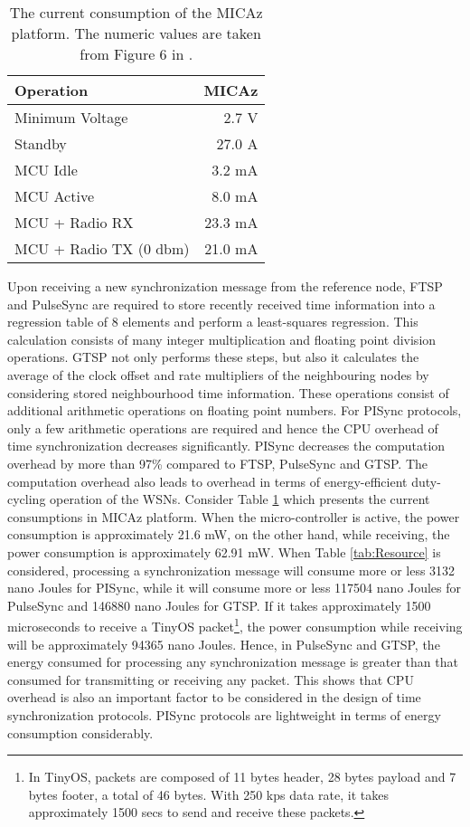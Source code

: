 \documentclass[english,a4paper,10pt,final]{article}
\numberwithin{equation}{section}
\numberwithin{figure}{section}
\begin{document}
\begin{table}
\center

\caption{The current consumption of the MICAz platform. The numeric values are taken from Figure 6 in
\cite{Telos:2005}. \label{tab:The-current-consumptions}}

{
\begin{tabular}{|l|r|}
\hline 
\textbf{Operation} & \textbf{MICAz}\\
\hline 
Minimum Voltage  & 2.7 V\\
\hline 
Standby & 27.0 A\\
MCU Idle & 3.2 mA\\
MCU Active & 8.0 mA\\
MCU + Radio RX  & 23.3 mA\\
MCU + Radio TX (0 dbm) & 21.0 mA\\
\hline
\end{tabular}
}
\end{table}

Upon receiving a new synchronization message from the reference node, FTSP and PulseSync are required to store recently received time information into a regression table of 8 elements and perform a least-squares regression. This calculation consists of many integer multiplication and floating point division operations. GTSP not only performs these steps, but also it calculates the average of the clock offset and rate multipliers of the neighbouring nodes by considering stored neighbourhood time information. These operations consist of additional arithmetic operations on floating point numbers. For PISync protocols, only a few arithmetic operations are required and hence the CPU overhead of time synchronization decreases significantly. PISync decreases the computation overhead by more than 97\% compared to FTSP, PulseSync and  GTSP. The computation overhead also leads to overhead in terms of energy-efficient duty-cycling operation of the WSNs. Consider Table \ref{tab:The-current-consumptions} which presents the current consumptions in MICAz platform. When the micro-controller is active, the power consumption is approximately 21.6 mW, on the other hand, while receiving, the power consumption is approximately 62.91 mW. When Table \ref{tab:Resource} is considered,  processing a synchronization message will consume more or less 3132 nano Joules for PISync, while it will consume more or less 117504 nano Joules for PulseSync and 146880 nano Joules for GTSP. If it takes approximately 1500 microseconds to receive a TinyOS packet\footnote{In TinyOS, packets are composed of 11 bytes header, 28 bytes payload and 7 bytes footer, a total of 46 bytes. With 250 kps data rate, it takes approximately 1500  secs to send and receive these packets.}, the power consumption while receiving will be approximately 94365 nano Joules. Hence, in PulseSync and GTSP, the energy consumed for processing any synchronization message is greater than that consumed for transmitting or receiving any packet. This shows that CPU overhead is also an important factor to be considered in the design of time synchronization protocols. PISync protocols are lightweight in terms of energy consumption considerably.
\end{document}
